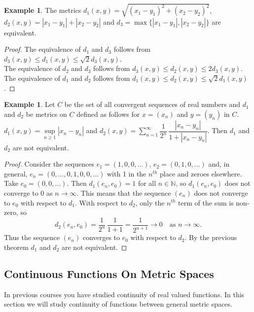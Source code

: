 \documentclass[11pt,a4paper]{article}
\theoremstyle{definition}
\newtheorem{exa}[thm]{Example}
\begin{document}
\begin{exa}
The metrics $d_1(x,y)=\sqrt{(x_1-y_1)^2+(x_2-y_2)^2}$, \\$d_2(x,y)=|x_1-y_1|+|x_2-y_2|$ and $d_3=\max\{|x_1-y_1|,|x_2-y_2|\}$ are equivalent.
\end{exa}

\begin{proof}
The equivalence of $d_1$ and $d_3$ follows from $d_3(x,y)\leq d_1(x,y)\leq \sqrt{2}d_3(x,y)$.\\ The equivalence of $d_2$ and $d_3$ follows from $d_3(x,y)\leq d_2(x,y)\leq 2d_3(x,y)$.\\ The equivalence of $d_1$ and $d_2$ follows from $d_1(x,y)\leq d_2(x,y)\leq \sqrt{2}d_1(x,y)$.
\end{proof}


\begin{exa}
Let $C$ be the set of all convergent sequences of real numbers and $d_1$ and $d_2$ be metrics on $C$ defined as follows for $x=(x_n)$ and $y=(y_n)$ in $C$. $d_1(x,y)=\sup\limits_{n\geq 1} |x_n-y_n|$ and $d_2(x,y)=\sum\limits ^{\infty}_{n=1}\dfrac{1}{2^n}\,\dfrac{|x_n-y_n|}{1+|x_n-y_n|}$. Then $d_1$ and $d_2$ are not equivalent.
\end{exa}

\begin{proof}
Consider the sequences $e_1=(1,0,0,\ldots)$, $e_2=(0,1,0,\ldots)$ and, in general, $e_n=(0,\ldots,0,1,0,0,\ldots)$ with 1 in the $n^{th}$ place and zeroes elsewhere. Take $e_0=(0,0,\ldots)$. Then $d_1(e_n,e_0)=1$ for all $n\in \mathbb{N}$, so $d_1(e_n,e_0)$ does not converge to 0 as $n\rightarrow \infty$. This means that the sequence $(e_n)$ does not converge to $e_0$ with respect to $d_1$. With respect to $d_2$, only the $n^{th}$ term of the sum is non-zero, so
$$d_2(e_n,e_0)=\frac{1}{2^n}\,\frac{1}{1+1}=\frac{1}{2^{n+1}} \rightarrow 0 \quad\text{as } n\rightarrow \infty.$$
Thus the sequence $(e_n)$ converges to $e_0$ with respect to $d_2$. By the previous theorem $d_1$ and $d_2$ are not equivalent.
\end{proof}



\subsection{Continuous Functions On Metric Spaces}
 In previous courses you have studied continuity of real valued functions. In this section we will study continuity of functions between general metric spaces.
 
\end{document}
